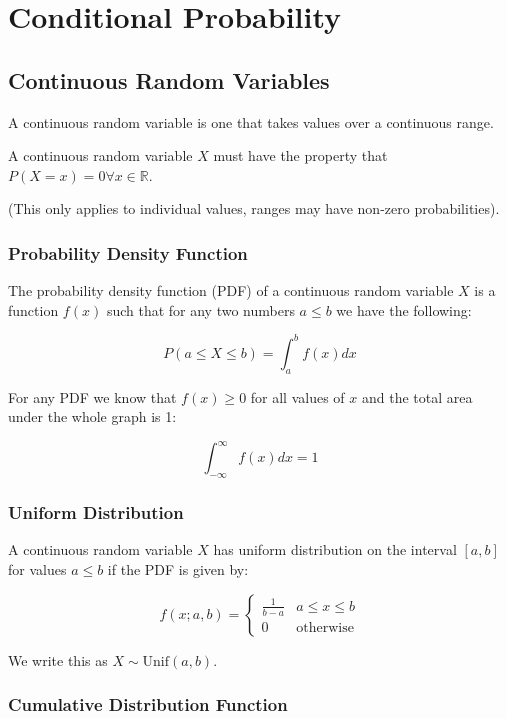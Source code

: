 \section{Conditional Probability}

\subsection*{Continuous Random Variables}

A continuous random variable is one that takes values over a continuous range.

A continuous random variable $X$ must have the property that $P(X=x)=0 \forall x \in \mathbb{R}$.

(This only applies to individual values, ranges may have non-zero probabilities).

\subsubsection*{Probability Density Function}

The probability density function (PDF) of a continuous random variable $X$ is a function $f(x)$ such that for any two numbers $a\leq b$ we have the following:

$$ P(a \leq X \leq b) = \int_a^b f(x) dx $$

For any PDF we know that $f(x) \geq 0$ for all values of $x$ and the total area under the whole graph is 1:

$$ \int_{-\infty}^{\infty} f(x) dx = 1 $$

\subsubsection*{Uniform Distribution}

A continuous random variable $X$ has uniform distribution on the interval $[a,b]$ for values $a \leq b$ if the PDF is given by:

$$ f(x; a,b) = \begin{cases} \frac{1}{b-a} & a \leq x \leq b \\ 0 & \text{otherwise} \end{cases} $$

We write this as $X \sim \text{Unif}(a,b)$.

\subsubsection*{Cumulative Distribution Function}

